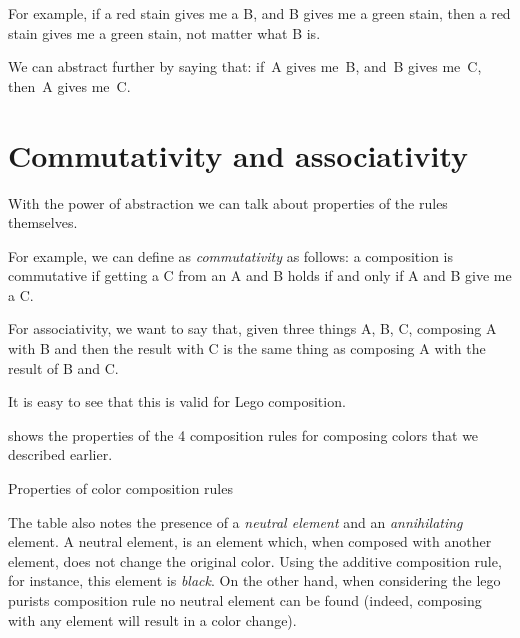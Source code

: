For example, if a red stain gives me a B, and B gives me a green stain, then a red stain gives me a green stain, not matter what B is.





We can abstract further by saying that: if~A gives me~B, and~B gives me~C, then~A gives me~C.



\section{Commutativity and associativity}

With the power of abstraction we can talk about properties of the rules themselves.

For example, we can define as \emph{commutativity} as follows: a composition is commutative if getting a C from an A and B holds if and only if A and B give me a C.


For associativity, we want to say that, given three things A, B, C, composing A with B and then the result with C is the same thing as composing A with the result of B and C.


It is easy to see that this is valid for Lego composition.



 shows the properties of the 4 composition rules for composing colors that we described earlier.

\begin{table*}[p]
    \caption{Properties of color composition rules}
    \label{tab:color-properties}
\end{table*}

The table also notes the presence of a \emph{neutral element} and an \emph{annihilating} element.
A neutral element, is an element which, when composed with another element, does not change the original color.
Using the additive composition rule, for instance, this element is \emph{black}.
On the other hand, when considering the lego purists composition rule no neutral element can be found (indeed, composing with any element will result in a color change).


